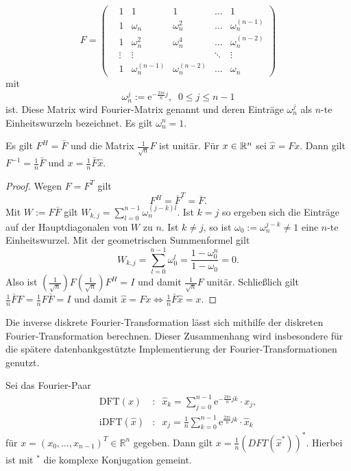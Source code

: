 \begin{equation}
    \label{eq:FM}
    F=\begin{pmatrix}
        &1 &1 &1 &\ldots &1 \\
        &1 &\omega_n &\omega_n^2 &\ldots &\omega_n^{(n-1)} \\
        &1 &\omega_n^2 &\omega_n^4 &\ldots &\omega_n^{(n-2)} \\
        &\vdots &\vdots & &\ddots &\vdots \\
        &1 &\omega_n^{(n-1)} &\omega_n^{(n-2)}  &\ldots &\omega_n
    \end{pmatrix}
\end{equation}
mit 
\begin{equation*}
    \omega_n^{j}:=\mathrm{e}^{- \frac{2 \pi i}{n} j}, \; \; 0 \leq j \leq n-1
\end{equation*}
ist. Diese Matrix wird Fourier-Matrix genannt und deren Einträge $\omega_n^{j}$ als $n$-te Einheitswurzeln bezeichnet. Es gilt $\omega_n^n=1$.
\begin{lem}
    \label{lem:Finv}
    Es gilt $F^H=\bar{F}$ und die Matrix $\frac{1}{\sqrt{n}} F$ ist unitär. Für $x \in \mathbb{R}^n$ sei $\hat{x}=Fx$. Dann gilt $F^{-1}=\frac{1}{n} \bar{F}$ und $x= \frac{1}{n}\bar{F} \hat{x}$.
\end{lem}
\begin{proof}
    Wegen $F=F^T$ gilt 
    \begin{equation*}
        F^H=\bar{{F}}^T=\bar{F}.
    \end{equation*}
    Mit $W:=F\bar{F}$ gilt $W_{k,j}=\sum_{l=0}^{n-1} \omega_n^{(j-k)l}$. Ist $k=j$ so ergeben sich die Einträge auf der Hauptdiagonalen von $W$ zu $n$. Ist $k \neq j$, so ist $\omega_0:=\omega_n^{j-k} \neq 1$ eine $n$-te Einheitswurzel.
    Mit der geometrischen Summenformel gilt
    \begin{equation*}
        W_{k,j}=\sum_{l=0}^{n-1} \omega_0^l=\frac{1-\omega_0^n}{1-\omega_0}=0.
    \end{equation*} 
    Also ist $\left(\frac{1}{\sqrt{n}}\right) F\left(\frac{1}{\sqrt{n}}\right) F^H=I$ und damit $\frac{1}{\sqrt{n}} F$ unitär. Schließlich gilt $\frac{1}{n} \bar{F} F=\frac{1}{n} F \bar{F}= I$ und damit $\hat{x}=Fx \Leftrightarrow \frac{1}{n}\bar{F} \hat{x}=x$.
\end{proof} 
Die inverse diskrete Fourier-Transformation lässt sich mithilfe der diskreten Fourier-Transformation berechnen. Dieser Zusammenhang wird insbesondere für die spätere datenbankgestützte Implementierung der Fourier-Transformationen genutzt.
\begin{lem}
    \label{lem:inversedftasdft}
    Sei das Fourier-Paar
    \begin{align*}
        \mathrm{DFT}(x)&: \; \;\hat{x}_k=\sum_{j=0}^{n-1} \mathrm{e}^{- \frac{2 \pi i}{n} j k} \cdot x_j, \\ 
        \mathrm{iDFT}(\hat{x})&:\; \; x_j= \frac{1}{n} \sum_{k=0}^{n-1} \mathrm{e}^{\frac{2 \pi i}{n} j k} \cdot \hat{x}_k
    \end{align*}
    für $x=(x_0, \ldots, x_{n-1})^T \in \mathbb{R}^n$ gegeben. Dann gilt $x=\frac{1}{n} (DFT(\hat{x}^*))^*$. Hierbei ist mit ${}^*$ die komplexe Konjugation gemeint.
\end{lem}
